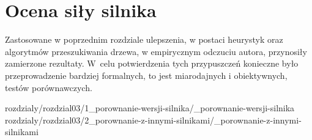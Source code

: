 
\chapter {Ocena siły silnika}
\label {ch: ocena-sily-silnika}

Zastosowane w poprzednim rozdziale ulepszenia, w postaci heurystyk oraz algorytmów przeszukiwania drzewa, w empirycznym odczuciu autora, przynosiły zamierzone rezultaty.
W~celu potwierdzenia tych przypuszczeń konieczne było przeprowadzenie bardziej formalnych, to jest miarodajnych i obiektywnych, testów porównawczych.

 {rozdzialy/rozdzial03/1_porownanie-wersji-silnika/_porownanie-wersji-silnika}
 {rozdzialy/rozdzial03/2_porownanie-z-innymi-silnikami/_porownanie-z-innymi-silnikami}


